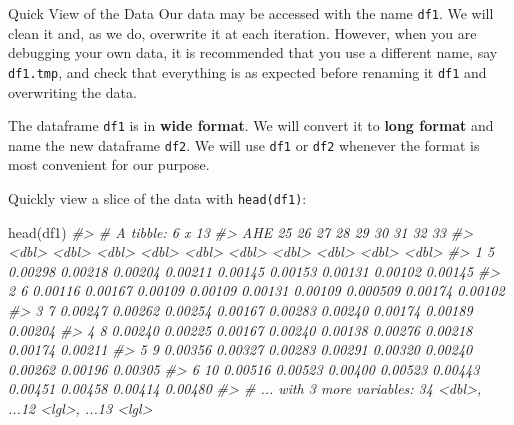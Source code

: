 \documentclass[
  11pt,
  ignorenonframetext,
  svgnames, handout, t]{beamer}
\newenvironment{Shaded}{\begin{snugshade}}{\end{snugshade}}
\newcommand{\CommentTok}[1]{\textcolor[rgb]{0.56,0.35,0.01}{\textit{#1}}}
\newcommand{\FunctionTok}[1]{\textcolor[rgb]{0.00,0.00,0.00}{#1}}
\newcommand{\NormalTok}[1]{#1}
\begin{document}
\begin{frame}[fragile]{Quick View of the Data}
\protect\hypertarget{quick-view-of-the-data}{}
Our data may be accessed with the name \texttt{df1}. We will clean it
and, as we do, overwrite it at each iteration. However, when you are
debugging your own data, it is recommended that you use a different
name, say \texttt{df1.tmp}, and check that everything is as expected
before renaming it \texttt{df1} and overwriting the data.

The dataframe \texttt{df1} is in \textbf{wide format}. We will convert
it to \textbf{long format} and name the new dataframe \texttt{df2}. We
will use \texttt{df1} or \texttt{df2} whenever the format is most
convenient for our purpose.

Quickly view a slice of the data with \texttt{head(df1)}:

\footnotesize

\begin{Shaded}
\begin{Highlighting}[]
\FunctionTok{head}\NormalTok{(df1)}
\CommentTok{\#\textgreater{} \# A tibble: 6 x 13}
\CommentTok{\#\textgreater{}     AHE    \textasciigrave{}25\textasciigrave{}    \textasciigrave{}26\textasciigrave{}    \textasciigrave{}27\textasciigrave{}    \textasciigrave{}28\textasciigrave{}    \textasciigrave{}29\textasciigrave{}    \textasciigrave{}30\textasciigrave{}     \textasciigrave{}31\textasciigrave{}    \textasciigrave{}32\textasciigrave{}    \textasciigrave{}33\textasciigrave{}}
\CommentTok{\#\textgreater{}   \textless{}dbl\textgreater{}   \textless{}dbl\textgreater{}   \textless{}dbl\textgreater{}   \textless{}dbl\textgreater{}   \textless{}dbl\textgreater{}   \textless{}dbl\textgreater{}   \textless{}dbl\textgreater{}    \textless{}dbl\textgreater{}   \textless{}dbl\textgreater{}   \textless{}dbl\textgreater{}}
\CommentTok{\#\textgreater{} 1     5 0.00298 0.00218 0.00204 0.00211 0.00145 0.00153 0.00131  0.00102 0.00145}
\CommentTok{\#\textgreater{} 2     6 0.00116 0.00167 0.00109 0.00109 0.00131 0.00109 0.000509 0.00174 0.00102}
\CommentTok{\#\textgreater{} 3     7 0.00247 0.00262 0.00254 0.00167 0.00283 0.00240 0.00174  0.00189 0.00204}
\CommentTok{\#\textgreater{} 4     8 0.00240 0.00225 0.00167 0.00240 0.00138 0.00276 0.00218  0.00174 0.00211}
\CommentTok{\#\textgreater{} 5     9 0.00356 0.00327 0.00283 0.00291 0.00320 0.00240 0.00262  0.00196 0.00305}
\CommentTok{\#\textgreater{} 6    10 0.00516 0.00523 0.00400 0.00523 0.00443 0.00451 0.00458  0.00414 0.00480}
\CommentTok{\#\textgreater{} \# ... with 3 more variables: \textasciigrave{}34\textasciigrave{} \textless{}dbl\textgreater{}, ...12 \textless{}lgl\textgreater{}, ...13 \textless{}lgl\textgreater{}}
\end{Highlighting}
\end{Shaded}

\normalsize
\end{frame}
\end{document}
